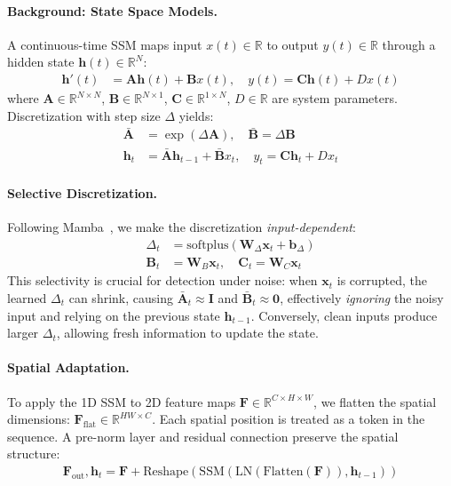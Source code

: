 \documentclass[review]{eccv2026}
\newcommand{\R}{\mathbb{R}}
\begin{document}
\paragraph{Background: State Space Models.}
A continuous-time SSM maps input $x(t) \in \R$ to output $y(t) \in \R$ through a hidden state $\bm{h}(t) \in \R^N$:
\begin{align}
  \bm{h}'(t) &= \bm{A}\bm{h}(t) + \bm{B}x(t), \quad y(t) = \bm{C}\bm{h}(t) + Dx(t) \label{eq:continuous_ssm}
\end{align}
where $\bm{A} \in \R^{N \times N}$, $\bm{B} \in \R^{N \times 1}$, $\bm{C} \in \R^{1 \times N}$, $D \in \R$ are system parameters. Discretization with step size $\Delta$ yields:
\begin{align}
  \bar{\bm{A}} &= \exp(\Delta \bm{A}), \quad \bar{\bm{B}} = \Delta \bm{B} \label{eq:discretize} \\
  \bm{h}_t &= \bar{\bm{A}}\bm{h}_{t-1} + \bar{\bm{B}}x_t, \quad y_t = \bm{C}\bm{h}_t + Dx_t \label{eq:discrete_ssm}
\end{align}

\paragraph{Selective Discretization.}
Following Mamba~\cite{mamba}, we make the discretization \textit{input-dependent}:
\begin{align}
  \Delta_t &= \text{softplus}(\bm{W}_\Delta \bm{x}_t + \bm{b}_\Delta) \label{eq:selective_dt} \\
  \bm{B}_t &= \bm{W}_B \bm{x}_t, \quad \bm{C}_t = \bm{W}_C \bm{x}_t \label{eq:selective_bc}
\end{align}
This selectivity is crucial for detection under noise: when $\bm{x}_t$ is corrupted, the learned $\Delta_t$ can shrink, causing $\bar{\bm{A}}_t \approx \bm{I}$ and $\bar{\bm{B}}_t \approx \bm{0}$, effectively \textit{ignoring} the noisy input and relying on the previous state $\bm{h}_{t-1}$.
Conversely, clean inputs produce larger $\Delta_t$, allowing fresh information to update the state.

\paragraph{Spatial Adaptation.}
To apply the 1D SSM to 2D feature maps $\bm{F} \in \R^{C \times H \times W}$, we flatten the spatial dimensions: $\bm{F}_\text{flat} \in \R^{HW \times C}$.
Each spatial position is treated as a token in the sequence.
A pre-norm layer and residual connection preserve the spatial structure:
\begin{align}
  \bm{F}_\text{out}, \bm{h}_t = \bm{F} + \text{Reshape}(\text{SSM}(\text{LN}(\text{Flatten}(\bm{F})), \bm{h}_{t-1})) \label{eq:spatial_ssm}
\end{align}
\end{document}
